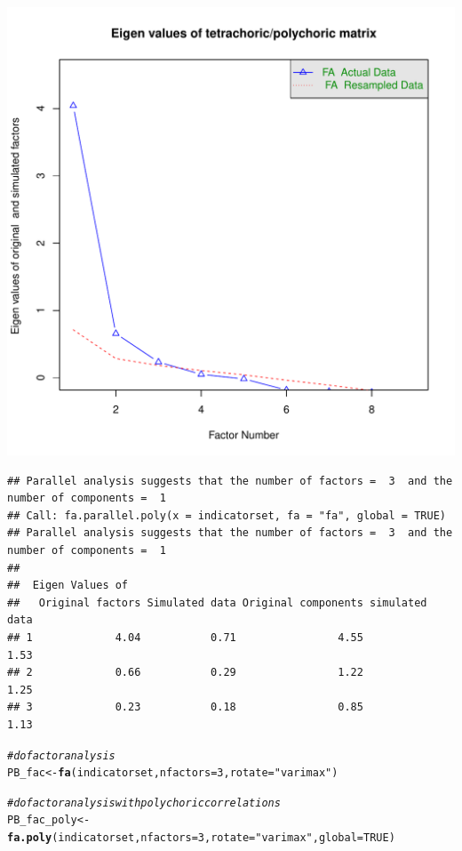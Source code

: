 \documentclass{article}\usepackage[]{graphicx}\usepackage[]{color}
\makeatletter
\def\maxwidth{ %
  \ifdim\Gin@nat@width>\linewidth
    \linewidth
  \else
    \Gin@nat@width
  \fi
}
\newcommand{\hlnum}[1]{\textcolor[rgb]{0.686,0.059,0.569}{#1}}%
\newcommand{\hlstr}[1]{\textcolor[rgb]{0.192,0.494,0.8}{#1}}%
\newcommand{\hlcom}[1]{\textcolor[rgb]{0.678,0.584,0.686}{\textit{#1}}}%
\newcommand{\hlstd}[1]{\textcolor[rgb]{0.345,0.345,0.345}{#1}}%
\newcommand{\hlkwb}[1]{\textcolor[rgb]{0.69,0.353,0.396}{#1}}%
\newcommand{\hlkwc}[1]{\textcolor[rgb]{0.333,0.667,0.333}{#1}}%
\newcommand{\hlkwd}[1]{\textcolor[rgb]{0.737,0.353,0.396}{\textbf{#1}}}%
\newenvironment{kframe}{%
 \def\at@end@of@kframe{}%
 \ifinner\ifhmode%
  \def\at@end@of@kframe{\end{minipage}}%
  \begin{minipage}{\columnwidth}%
 \fi\fi%
 \def\FrameCommand##1{\hskip\@totalleftmargin \hskip-\fboxsep
 \colorbox{shadecolor}{##1}\hskip-\fboxsep
     \hskip-\linewidth \hskip-\@totalleftmargin \hskip\columnwidth}%
 \MakeFramed {\advance\hsize-\width
   \@totalleftmargin\z@ \linewidth\hsize
   \@setminipage}}%
 {\par\unskip\endMakeFramed%
 \at@end@of@kframe}
\newenvironment{knitrout}{}{} %
\makeatother
\begin{document}
\begin{knitrout}
\includegraphics[width=\maxwidth]{figure/psych2} 
\begin{kframe}\begin{verbatim}
## Parallel analysis suggests that the number of factors =  3  and the number of components =  1
## Call: fa.parallel.poly(x = indicatorset, fa = "fa", global = TRUE)
## Parallel analysis suggests that the number of factors =  3  and the number of components =  1 
## 
##  Eigen Values of 
##   Original factors Simulated data Original components simulated data
## 1             4.04           0.71                4.55           1.53
## 2             0.66           0.29                1.22           1.25
## 3             0.23           0.18                0.85           1.13
\end{verbatim}
\begin{alltt}
\hlcom{#do factor analysis}
\hlstd{PB_fac} \hlkwb{<-} \hlkwd{fa}\hlstd{(indicatorset,} \hlkwc{nfactors}\hlstd{=}\hlnum{3}\hlstd{,} \hlkwc{rotate}\hlstd{=}\hlstr{"varimax"}\hlstd{)}

\hlcom{#do factor analysis with polychoric correlations}
\hlstd{PB_fac_poly} \hlkwb{<-} \hlkwd{fa.poly}\hlstd{(indicatorset,} \hlkwc{nfactors}\hlstd{=}\hlnum{3}\hlstd{,} \hlkwc{rotate}\hlstd{=}\hlstr{"varimax"}\hlstd{,}\hlkwc{global}\hlstd{=}\hlnum{TRUE}\hlstd{)}


\end{alltt}
\end{kframe}
\end{knitrout}
\end{document}
